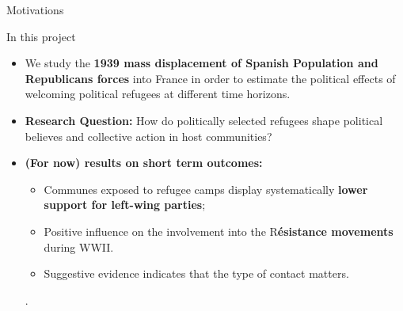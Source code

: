 \documentclass[xcolor=dvipsnames, aspectratio=169]{beamer}
\begin{document}
\begin{frame}{Motivations}
\end{frame}

\begin{frame}{In this project}

\begin{itemize}
  \item We study the \textbf{1939 mass displacement of Spanish Population and Republicans forces} into France in order to estimate the political effects of welcoming political refugees at different time horizons.
  \vspace{0.15in}
  \item \textbf{Research Question:} How do politically selected refugees shape political believes and collective action in host communities?
  \vspace{0.2in}
  \item \textbf{(For now) results on short term outcomes:} 
  \vspace{0.05in}
  \begin{itemize}
      \item Communes exposed to refugee camps display systematically \textbf{lower support for left-wing parties};
      \vspace{0.1in}
      \item Positive influence on the involvement into the R\textbf{ésistance movements} during WWII. 
      \vspace{0.1in}
      \item Suggestive evidence indicates that the type of contact matters.
  \end{itemize}. 
\end{itemize}


\end{frame}
\end{document}
